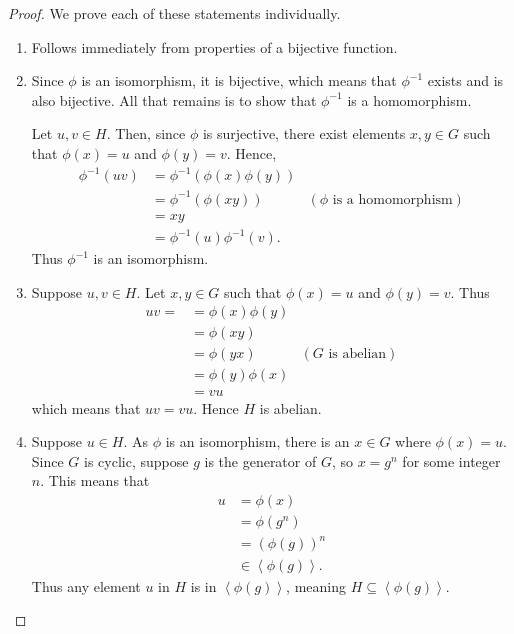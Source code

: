 \begin{proof}
    We prove each of these statements individually.
    \begin{enumerate}
        \item Follows immediately from properties of a bijective function.

        \item Since $\phi$ is an isomorphism, it is bijective, which means that $\phi^{-1}$ exists and is also bijective. All that remains is to show that $\phi^{-1}$ is a homomorphism.

        Let $u, v \in H$. Then, since $\phi$ is surjective, there exist elements $x, y \in G$ such that $\phi(x) = u$ and $\phi(y) = v$. Hence,
        \begin{align*}
            \phi^{-1}(uv) &= \phi^{-1}\left(\phi(x)\phi(y)\right)\\
            &= \phi^{-1}\left(\phi(xy)\right) & (\phi \text{ is a homomorphism})\\
            &= xy\\
            &= \phi^{-1}(u) \phi^{-1}(v).
        \end{align*}
        Thus $\phi^{-1}$ is an isomorphism.

        \item Suppose $u, v \in H$. Let $x, y \in G$ such that $\phi(x) = u$ and $\phi(y) = v$. Thus
        \begin{align*}
            uv = &= \phi(x)\phi(y) \\
            &= \phi(xy)\\
            &= \phi(yx) & (G \text{ is abelian})\\
            &= \phi(y)\phi(x)\\
            &= vu
        \end{align*}
        which means that $uv = vu$. Hence $H$ is abelian.

        \item Suppose $u \in H$. As $\phi$ is an isomorphism, there is an $x \in G$ where $\phi(x) = u$. Since $G$ is cyclic, suppose $g$ is the generator of $G$, so $x = g^n$ for some integer $n$. This means that
        \begin{align*}
            u &= \phi(x)\\
            &= \phi(g^n)\\
            &= \left(\phi(g)\right)^n\\
            &\in \left\langle \phi(g) \right\rangle.
        \end{align*}
        Thus any element $u$ in $H$ is in $\left\langle \phi(g) \right\rangle$, meaning $H \subseteq \left\langle \phi(g) \right\rangle$.


\end{enumerate}
\end{proof}
